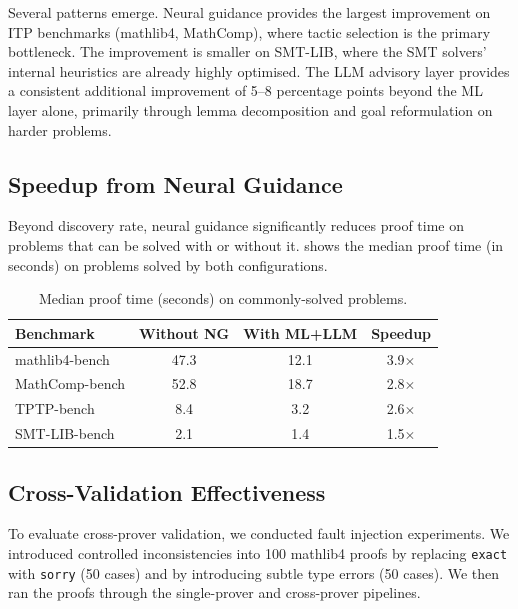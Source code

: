\documentclass[11pt,a4paper]{article}
\begin{document}
Several patterns emerge. Neural guidance provides the largest improvement on
ITP benchmarks (mathlib4, MathComp), where tactic selection is the primary
bottleneck. The improvement is smaller on SMT-LIB, where the SMT solvers'
internal heuristics are already highly optimised. The LLM advisory layer
provides a consistent additional improvement of 5--8 percentage points beyond
the ML layer alone, primarily through lemma decomposition and goal
reformulation on harder problems.

\subsection{Speedup from Neural Guidance}

Beyond discovery rate, neural guidance significantly reduces proof time on
problems that can be solved with or without it.  shows the
median proof time (in seconds) on problems solved by both configurations.

\begin{table}[htbp]
\centering
\caption{Median proof time (seconds) on commonly-solved problems.}
\label{tab:speedup}
\begin{tabular}{@{}lccc@{}}
\toprule
\textbf{Benchmark} & \textbf{Without NG} & \textbf{With ML+LLM} & \textbf{Speedup} \\
\midrule
mathlib4-bench   & 47.3 & 12.1 & 3.9$\times$ \\
MathComp-bench   & 52.8 & 18.7 & 2.8$\times$ \\
TPTP-bench       & 8.4  & 3.2  & 2.6$\times$ \\
SMT-LIB-bench    & 2.1  & 1.4  & 1.5$\times$ \\
\bottomrule
\end{tabular}
\end{table}

\subsection{Cross-Validation Effectiveness}

To evaluate cross-prover validation, we conducted fault injection experiments.
We introduced controlled inconsistencies into 100 mathlib4 proofs by
replacing \texttt{exact} with \texttt{sorry} (50 cases) and by introducing
subtle type errors (50 cases). We then ran the proofs through the single-prover
and cross-prover pipelines.
\end{document}
